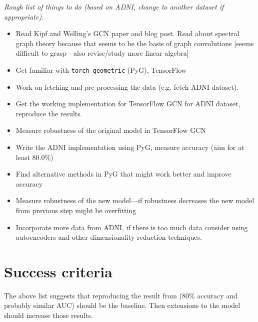 \documentclass[12pt,a4paper,twoside]{article}
\begin{document}
\begin{itemize}
\end{itemize}


\textit{Rough list of things to do (based on ADNI, change to another dataset if appropriate).}
\begin{itemize}
  \item Read Kipf and Welling's GCN paper \cite{kipf2017semi} and blog post. Read about spectral graph theory because that seems to be the basis of graph convolutions [seems difficult to grasp—also revise/study more linear algebra]
  \item Get familiar with \texttt{torch\_geometric} (PyG), TensorFlow
  \item Work on fetching and pre-processing the data (e.g. fetch ADNI dataset).
  \item Get the working implementation for TensorFlow GCN for ADNI dataset, reproduce the results.
  \item Measure robustness of the original model in TensorFlow GCN
  \item Write the ADNI implementation using PyG, measure accuracy (aim for at least 80.0\%)
  \item Find alternative methods in PyG that might work better and improve accuracy
  \item Measure robustness of the new model—if robustness decreases the new model from previous step might be overfitting
  \item Incorporate more data from ADNI, if there is too much data consider using autoencoders and other dimensionality reduction techniques.
\end{itemize}

\section*{Success criteria}




The above list suggests that reproducing the result from \cite{parisot2018disease} (80\% accuracy and probably similar AUC) should be the baseline. Then extensions to the model should increase those results.
\end{document}
